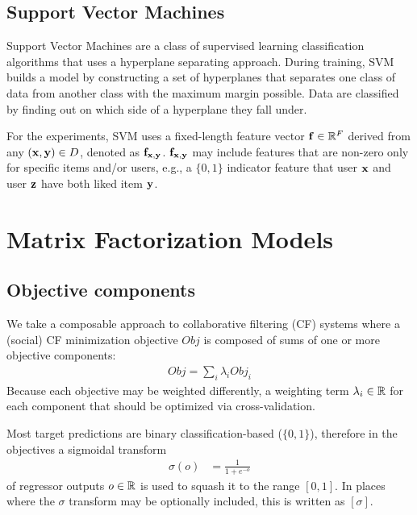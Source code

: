 \subsection{Support Vector Machines}

Support Vector Machines are a class of supervised learning classification algorithms that uses a hyperplane separating approach. During training, SVM builds a model by constructing a set of hyperplanes that separates one class of data from another class with the maximum margin possible. Data are classified by finding out on which side of a hyperplane they fall under.

For the experiments, SVM uses a fixed-length feature vector
$\mathbf{f} \in \mathbb{R}^F$ derived from any $(\mathbf{x},\mathbf{y}) \in D$, denoted
as $\mathbf{f}_{\mathbf{x},\mathbf{y}}$.  $\mathbf{f}_{\mathbf{x},\mathbf{y}}$ may include features
that are non-zero only for specific items and/or users, e.g., a $\{0,1\}$ 
indicator feature that user $\mathbf{x}$
and user $\mathbf{z}$ have both liked item $\mathbf{y}$.  

\section{Matrix Factorization Models}

\subsection{Objective components}

We take a composable approach to collaborative filtering (CF) systems
where a (social) CF minimization 
objective $\mathit{Obj}$ is composed of sums of one or more
objective components:
\begin{align}
\mathit{Obj} = \sum_i \lambda_i \mathit{Obj}_i
\end{align}
Because each objective may be weighted differently, a 
weighting term $\lambda_i \in \mathbb{R}$ for each component that should be
optimized via cross-validation.

Most target predictions are binary 
classification-based ($\{0,1\}$), therefore
in the objectives a sigmoidal transform 
\begin{align}
\sigma(o) & = \frac{1}{1 + e^{-o}}
\end{align}
of regressor outputs $o \in \mathbb{R}$ is used to squash it 
to the range $[0, 1]$.  
In places where the $\sigma$ transform may be optionally included, 
this is written as $[\sigma]$.  

